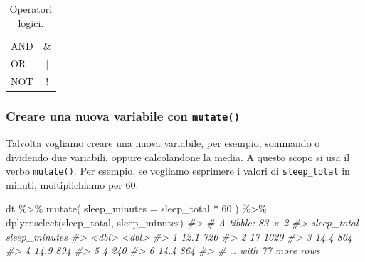 \documentclass[
  10pt,
  italian,
  a4paper,
  extrafontsizes,onecolumn,openright
  ]{memoir}
\newenvironment{Shaded}{\begin{snugshade}}{\end{snugshade}}
\newcommand{\AttributeTok}[1]{\textcolor[rgb]{0.77,0.63,0.00}{#1}}
\newcommand{\CommentTok}[1]{\textcolor[rgb]{0.56,0.35,0.01}{\textit{#1}}}
\newcommand{\DecValTok}[1]{\textcolor[rgb]{0.00,0.00,0.81}{#1}}
\newcommand{\FunctionTok}[1]{\textcolor[rgb]{0.00,0.00,0.00}{#1}}
\newcommand{\NormalTok}[1]{#1}
\newcommand{\SpecialCharTok}[1]{\textcolor[rgb]{0.00,0.00,0.00}{#1}}
\begin{document}
\begin{table}[h!]
  \begin{center}
    \caption{Operatori logici.}
    \label{tab:oplogici}
    \begin{tabular}{l c} 
      \toprule
      AND      &  \&    \\
      OR       &  | \\
      NOT      &  !   \\
      \bottomrule
    \end{tabular}
  \end{center}
\end{table}

\hypertarget{creare-una-nuova-variabile-con-mutate}{%
\subsubsection{\texorpdfstring{Creare una nuova variabile con \texttt{mutate()}}{Creare una nuova variabile con mutate()}}\label{creare-una-nuova-variabile-con-mutate}}

Talvolta vogliamo creare una nuova variabile, per esempio, sommando o dividendo due variabili, oppure calcolandone la media. A questo scopo si usa il verbo \texttt{mutate()}. Per esempio, se vogliamo esprimere i valori di \texttt{sleep\_total} in minuti, moltiplichiamo per 60:

\begin{Shaded}
\begin{Highlighting}[]
\NormalTok{dt }\SpecialCharTok{\%\textgreater{}\%} 
  \FunctionTok{mutate}\NormalTok{(}
    \AttributeTok{sleep\_minutes =}\NormalTok{ sleep\_total }\SpecialCharTok{*} \DecValTok{60}
\NormalTok{  ) }\SpecialCharTok{\%\textgreater{}\%}
\NormalTok{  dplyr}\SpecialCharTok{::}\FunctionTok{select}\NormalTok{(sleep\_total, sleep\_minutes)}
\CommentTok{\#\textgreater{} \# A tibble: 83 × 2}
\CommentTok{\#\textgreater{}   sleep\_total sleep\_minutes}
\CommentTok{\#\textgreater{}         \textless{}dbl\textgreater{}         \textless{}dbl\textgreater{}}
\CommentTok{\#\textgreater{} 1        12.1           726}
\CommentTok{\#\textgreater{} 2        17            1020}
\CommentTok{\#\textgreater{} 3        14.4           864}
\CommentTok{\#\textgreater{} 4        14.9           894}
\CommentTok{\#\textgreater{} 5         4             240}
\CommentTok{\#\textgreater{} 6        14.4           864}
\CommentTok{\#\textgreater{} \# … with 77 more rows}
\end{Highlighting}
\end{Shaded}
\end{document}
